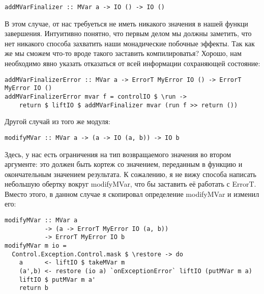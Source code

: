 \begin{lstlisting}
addMVarFinalizer :: MVar a -> IO () -> IO ()
\end{lstlisting}

В этом случае, от нас требуеться не иметь никакого значения в нашей функци
завершения. Интуитивно понятно, что первым делом мы должны заметить, что нет
никакого способа захватить наши монадические побочные эффекты. Так как же мы
сможем что-то вроде такого заставить компилироватья? Хорошо, нам необходимо
явно указать отказаться от всей информации сохраняющей состояние:

\begin{lstlisting}
addMVarFinalizerError :: MVar a -> ErrorT MyError IO () -> ErrorT MyError IO ()
addMVarFinalizerError mvar f = controlIO $ \run ->
    return $ liftIO $ addMVarFinalizer mvar (run f >> return ())
\end{lstlisting}

Другой случай из того же модуля:

\begin{lstlisting}
modifyMVar :: MVar a -> (a -> IO (a, b)) -> IO b
\end{lstlisting}

Здесь, у нас есть ограничения на тип возвращаемого значения во втором
аргументе: это должен быть кортеж со значением, переданным в функцию и
окончательным значением результата. К сожалению, я не вижу способа написать
небольшую обертку вокруг modifyMVar, что бы заставить её работать с ErrorT.
Вместо этого, в данном случае я скопировал определение modifyMVar и изменил
его:

\begin{lstlisting}
modifyMVar :: MVar a
           -> (a -> ErrorT MyError IO (a, b))
           -> ErrorT MyError IO b
modifyMVar m io =
  Control.Exception.Control.mask $ \restore -> do
    a      <- liftIO $ takeMVar m
    (a',b) <- restore (io a) `onExceptionError` liftIO (putMVar m a)
    liftIO $ putMVar m a'
    return b
\end{lstlisting}
